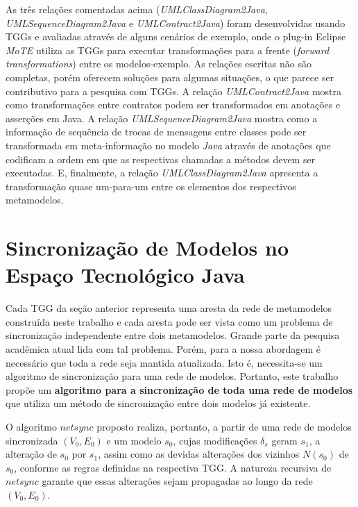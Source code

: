 \documentclass[cic,resumo-unibral]{iiufrgs}
\begin{document}
\begin{extendedsummary}
As três relações comentadas acima (\textit{UMLClassDiagram2Java}, \textit{UMLSequenceDiagram2Java} e \textit{UMLContract2Java}) foram desenvolvidas usando TGGs e avaliadas através de alguns cenários de exemplo, onde o plug-in Eclipse \emph{MoTE} utiliza as TGGs para executar transformações para a frente (\textit{forward transformations}) entre os modelos-exemplo. As relações escritas não são completas, porém oferecem soluções para algumas situações, o que parece ser contributivo para a pesquisa com TGGs. A relação \textit{UMLContract2Java} mostra como transformações entre contratos podem ser transformados em anotações e asserções em Java. A relação \textit{UMLSequenceDiagram2Java} mostra como a informação de sequência de trocas de mensagens entre classes pode ser transformada em meta-informação no modelo \textit{Java} através de anotações que codificam a ordem em que as respectivas chamadas a métodos devem ser executadas. E, finalmente, a relação \textit
{UMLClassDiagram2Java} apresenta a transformação quase um-para-um entre os elementos dos respectivos metamodelos.


\section{Sincronização de Modelos no Espaço Tecnológico Java}

Cada TGG da seção anterior representa uma aresta da rede de metamodelos construída neste trabalho e cada aresta pode ser vista como um problema de sincronização independente entre dois metamodelos. Grande parte da pesquisa acadêmica atual lida com tal problema. Porém, para a nossa abordagem é necessário que toda a rede seja mantida atualizada. Isto é, necessita-se um algoritmo de sincronização para uma rede de modelos. Portanto, este trabalho propõe um \textbf{algoritmo para a sincronização de toda uma rede de modelos} que utiliza um método de sincronização entre dois modelos já existente.


O algoritmo $netsync$ proposto realiza, portanto, a partir de uma rede de modelos sincronizada $(V_0,E_0)$ e um modelo $s_0$, cujas modificações $\delta_s$ geram $s_1$, a alteração de $s_0$ por $s_1$, assim como as devidas alterações dos vizinhos $N(s_0)$ de $s_0$, conforme as regras definidas na respectiva TGG. A natureza recursiva de $netsync$ garante que essas alterações sejam propagadas ao longo da rede $(V_0,E_0)$.


\end{extendedsummary}
\end{document}
